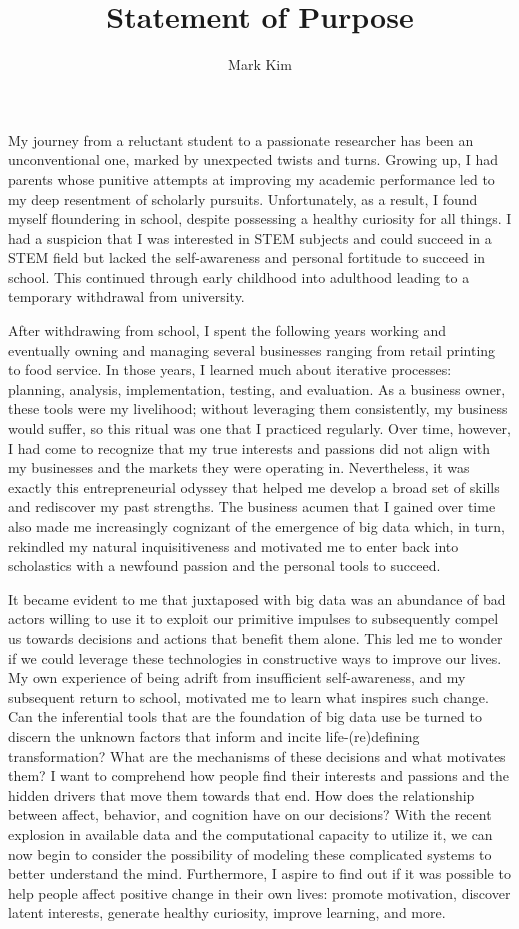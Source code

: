 \documentclass[12pt]{article}
\author{Mark Kim}
\title{Statement of Purpose}
\begin{document}
\maketitle
My journey from a reluctant student to a passionate researcher has been an unconventional one, marked by unexpected twists and turns. Growing
up, I had parents whose punitive attempts at improving my academic performance led to my deep resentment of scholarly pursuits.
Unfortunately, as a result, I found myself floundering in school, despite possessing a healthy curiosity for all things.
I had a suspicion that I was interested in STEM subjects and could succeed in a STEM field but lacked the self-awareness and personal
fortitude to succeed in school.  This continued through early childhood into adulthood leading to a temporary withdrawal from university.

After withdrawing from school, I spent the following years working and eventually owning and managing several businesses ranging from
retail printing to food service.  In those years, I learned much about iterative processes: planning, analysis, implementation, testing, and
evaluation.  As a business owner, these tools were my livelihood; without leveraging them consistently, my business would suffer, so this
ritual was one that I practiced regularly. Over time, however, I had come to recognize that my true interests and passions did not align
with my businesses and the markets they were operating in. Nevertheless, it was exactly this entrepreneurial odyssey that helped me develop
a broad set of skills and rediscover my past strengths.  The business acumen that I gained over time also made me increasingly cognizant of
the emergence of big data which, in turn, rekindled my natural inquisitiveness and motivated me to enter back into scholastics with a
newfound passion and the personal tools to succeed.

It became evident to me that juxtaposed with big data was an abundance of bad actors willing to use it to exploit our primitive
impulses to subsequently compel us towards decisions and actions that benefit them alone. This led me to wonder if we could leverage these
technologies in constructive ways to improve our lives. My own experience of being adrift from insufficient self-awareness, and my subsequent
return to school, motivated me to learn what inspires such change. Can the inferential tools that are the foundation of big data use be
turned to discern the unknown factors that inform and incite life-(re)defining transformation?  What are the mechanisms of these decisions
and what motivates them?  I want to comprehend how people find their interests and passions and the hidden drivers that move them towards
that end. How does the relationship between affect, behavior, and cognition have on our decisions?  With the recent explosion in available
data and the computational capacity to utilize it, we can now begin to consider the possibility of modeling these complicated systems to
better understand the mind.  Furthermore, I aspire to find out if it was possible to help people affect positive change in their own lives:
promote motivation, discover latent interests, generate healthy curiosity, improve learning, and more.
\end{document}
